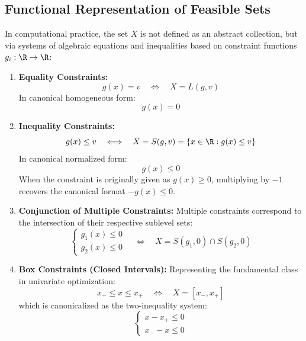 \subsection{Functional Representation of Feasible Sets}
In computational practice, the set $X$ is not defined as an abstract collection, but via systems of algebraic equations and inequalities based on constraint functions $g_i: \R \to \R$:
\begin{enumerate}
    \item \textbf{Equality Constraints:}
    \begin{equation}
    g(x) = v \quad \Longleftrightarrow \quad X = L(g, v)
    \end{equation}
    In canonical homogeneous form:
    \begin{equation}
    g(x) = 0
    \end{equation}
    \item \textbf{Inequality Constraints:}
    \begin{equation}
    g(x) \le v \quad \Longleftrightarrow \quad X = S(g, v) = \{ x \in \R : g(x) \le v \}
    \end{equation}
    In canonical normalized form:
    \begin{equation}
    g(x) \le 0
    \end{equation}
    When the constraint is originally given as $g(x) \ge 0$, multiplying by $-1$ recovers the canonical format $-g(x) \le 0$.
    \item \textbf{Conjunction of Multiple Constraints:}
    Multiple constraints correspond to the intersection of their respective sublevel sets:
    \begin{equation}
    \begin{cases} g_1(x) \le 0 \\ g_2(x) \le 0 \end{cases} \quad \Longleftrightarrow \quad X = S(g_1, 0) \cap S(g_2, 0)
    \end{equation}
    \item \textbf{Box Constraints (Closed Intervals):}
    Representing the fundamental class in univariate optimization:
    \begin{equation}
    x_- \le x \le x_+ \quad \Longleftrightarrow \quad X = [x_-, x_+]
    \end{equation}
    which is canonicalized as the two-inequality system:
    \begin{equation}
    \begin{cases} x - x_+ \le 0 \\ x_- - x \le 0 \end{cases}
    \end{equation}
\end{enumerate}


